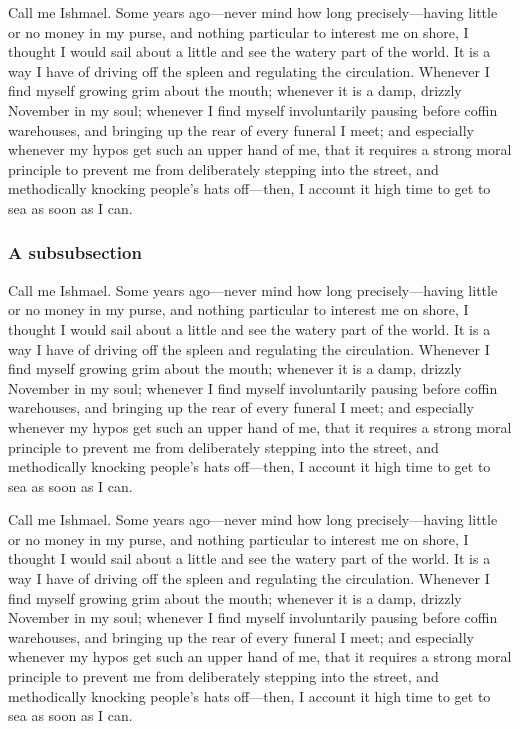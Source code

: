 \documentclass[12pt,a4paper]{article}
\begin{document}
Call me Ishmael. Some years ago---never mind how long precisely---having little or no money in my purse, and nothing particular to interest me on shore, I thought I would sail about a little and see the watery part of the world. It is a way I have of driving off the spleen and regulating the circulation. Whenever I find myself growing grim about the mouth; whenever it is a damp, drizzly November in my soul; whenever I find myself involuntarily pausing before coffin warehouses, and bringing up the rear of every funeral I meet; and especially whenever my hypos get such an upper hand of me, that it requires a strong moral principle to prevent me from deliberately stepping into the street, and methodically knocking people's hats off---then, I account it high time to get to sea as soon as I can.


\subsubsection{A subsubsection}

Call me Ishmael. Some years ago---never mind how long precisely---having little or no money in my purse, and nothing particular to interest me on shore, I thought I would sail about a little and see the watery part of the world. It is a way I have of driving off the spleen and regulating the circulation. Whenever I find myself growing grim about the mouth; whenever it is a damp, drizzly November in my soul; whenever I find myself involuntarily pausing before coffin warehouses, and bringing up the rear of every funeral I meet; and especially whenever my hypos get such an upper hand of me, that it requires a strong moral principle to prevent me from deliberately stepping into the street, and methodically knocking people's hats off---then, I account it high time to get to sea as soon as I can.


Call me Ishmael. Some years ago---never mind how long precisely---having little or no money in my purse, and nothing particular to interest me on shore, I thought I would sail about a little and see the watery part of the world. It is a way I have of driving off the spleen and regulating the circulation. Whenever I find myself growing grim about the mouth; whenever it is a damp, drizzly November in my soul; whenever I find myself involuntarily pausing before coffin warehouses, and bringing up the rear of every funeral I meet; and especially whenever my hypos get such an upper hand of me, that it requires a strong moral principle to prevent me from deliberately stepping into the street, and methodically knocking people's hats off---then, I account it high time to get to sea as soon as I can.
\end{document}
